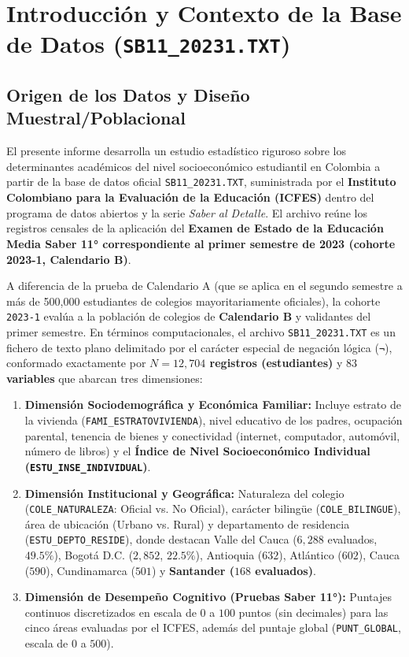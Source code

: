 \documentclass[11pt,letterpaper]{article}
\begin{document}
\tableofcontents
\newpage

\section{Introducción y Contexto de la Base de Datos (\texttt{SB11\_20231.TXT})}

\subsection{Origen de los Datos y Diseño Muestral/Poblacional}
El presente informe desarrolla un estudio estadístico riguroso sobre los determinantes académicos del nivel socioeconómico estudiantil en Colombia a partir de la base de datos oficial \texttt{SB11\_20231.TXT}, suministrada por el \textbf{Instituto Colombiano para la Evaluación de la Educación (ICFES)} dentro del programa de datos abiertos y la serie \textit{Saber al Detalle}. El archivo reúne los registros censales de la aplicación del \textbf{Examen de Estado de la Educación Media Saber 11° correspondiente al primer semestre de 2023 (cohorte 2023-1, Calendario B)}.

A diferencia de la prueba de Calendario A (que se aplica en el segundo semestre a más de 500,000 estudiantes de colegios mayoritariamente oficiales), la cohorte \texttt{2023-1} evalúa a la población de colegios de \textbf{Calendario B} y validantes del primer semestre. En términos computacionales, el archivo \texttt{SB11\_20231.TXT} es un fichero de texto plano delimitado por el carácter especial de negación lógica (\texttt{¬}), conformado exactamente por \textbf{$N = 12,704$ registros (estudiantes)} y \textbf{$83$ variables} que abarcan tres dimensiones:
\begin{enumerate}
    \item \textbf{Dimensión Sociodemográfica y Económica Familiar:} Incluye estrato de la vivienda (\texttt{FAMI\_ESTRATOVIVIENDA}), nivel educativo de los padres, ocupación parental, tenencia de bienes y conectividad (internet, computador, automóvil, número de libros) y el \textbf{Índice de Nivel Socioeconómico Individual (\texttt{ESTU\_INSE\_INDIVIDUAL})}.
    \item \textbf{Dimensión Institucional y Geográfica:} Naturaleza del colegio (\texttt{COLE\_NATURALEZA}: Oficial vs. No Oficial), carácter bilingüe (\texttt{COLE\_BILINGUE}), área de ubicación (Urbano vs. Rural) y departamento de residencia (\texttt{ESTU\_DEPTO\_RESIDE}), donde destacan Valle del Cauca ($6,288$ evaluados, $49.5\%$), Bogotá D.C. ($2,852$, $22.5\%$), Antioquia ($632$), Atlántico ($602$), Cauca ($590$), Cundinamarca ($501$) y \textbf{Santander ($168$ evaluados)}.
    \item \textbf{Dimensión de Desempeño Cognitivo (Pruebas Saber 11°):} Puntajes continuos discretizados en escala de $0$ a $100$ puntos (sin decimales) para las cinco áreas evaluadas por el ICFES, además del puntaje global (\texttt{PUNT\_GLOBAL}, escala de $0$ a $500$).
\end{enumerate}
\end{document}
